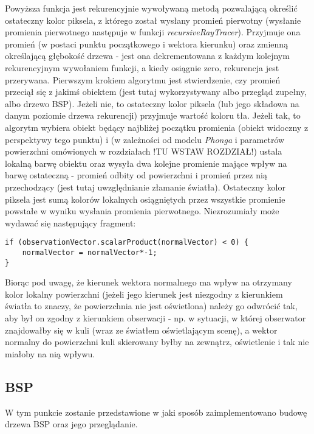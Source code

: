 Powyższa funkcja jest rekurencyjnie wywoływaną metodą pozwalającą określić ostateczny kolor piksela, z którego został wysłany promień pierwotny (wysłanie promienia pierwotnego następuje w funkcji \emph{recursiveRayTracer}). Przyjmuje ona promień (w postaci punktu początkowego i wektora kierunku) oraz zmienną określającą głębokość drzewa - jest ona dekrementowana z każdym kolejnym rekurencyjnym wywołaniem funkcji, a kiedy osiągnie zero, rekurencja jest przerywana. Pierwszym krokiem algorytmu jest stwierdzenie, czy promień przeciął się z jakimś obiektem (jest tutaj wykorzystywany albo przegląd zupełny, albo drzewo BSP). Jeżeli nie, to ostateczny kolor piksela (lub jego składowa na danym poziomie drzewa rekurencji) przyjmuje wartość koloru tła. Jeżeli tak, to algorytm wybiera obiekt będący najbliżej początku promienia (obiekt widoczny z perspektywy tego punktu) i (w zależności od modelu \emph{Phonga} i parametrów powierzchni omówionych w rozdziałach !TU WSTAW ROZDZIAŁ!) ustala lokalną barwę obiektu oraz wysyła dwa kolejne promienie mające wpływ na barwę ostateczną - promień odbity od powierzchni i promień przez nią przechodzący (jest tutaj uwzględnianie złamanie światła).
Ostateczny kolor piksela jest sumą kolorów lokalnych osiągniętych przez wszystkie promienie powstałe w wyniku wysłania promienia pierwotnego.	Niezrozumiały może wydawać się następujący fragment:

\begin{lstlisting}[caption={}]
if (observationVector.scalarProduct(normalVector) < 0) {
    normalVector = normalVector*-1;
}
\end{lstlisting}

Biorąc pod uwagę, że kierunek wektora normalnego ma wpływ na otrzymany kolor lokalny powierzchni (jeżeli jego kierunek jest niezgodny z kierunkiem światła to znaczy, że powierzchnia nie jest oświetlona) należy go odwrócić tak, aby był on zgodny z kierunkiem obserwacji - np. w sytuacji, w której obserwator znajdowałby się w kuli (wraz ze światłem oświetlającym scenę), a wektor normalny do powierzchni kuli skierowany byłby na zewnątrz, oświetlenie i tak nie miałoby na nią wpływu.

\subsection{BSP}

W tym punkcie zostanie przedstawione w jaki sposób zaimplementowano budowę drzewa BSP oraz jego przeglądanie.


